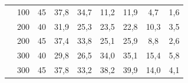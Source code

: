 \begin{table}[h]
{\begin{tabular}{ccccccccc}
        	                      &         100          &   45   &   37,8   &   34,7    &   11,2   &   11,9    &   4,7    &    1,6    \\
        	                      &         200          &   40   &   31,9   &   25,3    &   23,5   &   22,8    &   10,3   &    3,5    \\
        	                      &         200          &   45   &   37,4   &   33,8    &   25,1   &   25,9    &   8,8    &    2,6    \\
        	                      &         300          &   40   &   29,8   &   26,5    &   34,0   &   35,1    &   15,4   &    5,8    \\
        	                      &         300          &   45   &   37,8   &   33,2    &   38,2   &   39,9    &   14,0   &    4,1    \\ \bottomrule
        \end{tabular}}%
        {}
    \end{table}
  
  \clearpage
  
  
